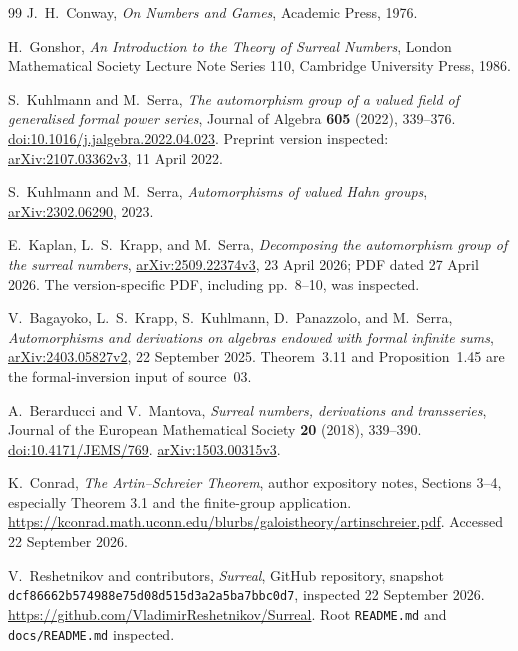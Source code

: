 \documentclass[11pt]{article}
\theoremstyle{definition}
\theoremstyle{remark}
\newcommand{\repoSHA}{\texttt{dcf86662\allowbreak b574988e\allowbreak 75d08d51\allowbreak 5d3a2a5b\allowbreak a7bbc0d7}}
\numberwithin{equation}{section}
\begin{document}
{}
\begin{thebibliography}{99}
\small\RaggedRight
{}
J.~H.~Conway,
\emph{On Numbers and Games}, Academic Press, 1976.

H.~Gonshor,
\emph{An Introduction to the Theory of Surreal Numbers},
London Mathematical Society Lecture Note Series 110,
Cambridge University Press, 1986.

S.~Kuhlmann and M.~Serra,
\emph{The automorphism group of a valued field of generalised formal power series},
Journal of Algebra \textbf{605} (2022), 339--376.
\href{https://doi.org/10.1016/j.jalgebra.2022.04.023}{doi:10.1016/j.jalgebra.2022.04.023}.
Preprint version inspected: \href{https://arxiv.org/abs/2107.03362v3}{arXiv:2107.03362v3},
11 April 2022.

S.~Kuhlmann and M.~Serra,
\emph{Automorphisms of valued Hahn groups},
\href{https://arxiv.org/abs/2302.06290}{arXiv:2302.06290}, 2023.

E.~Kaplan, L.~S.~Krapp, and M.~Serra,
\emph{Decomposing the automorphism group of the surreal numbers},
\href{https://arxiv.org/abs/2509.22374v3}{arXiv:2509.22374v3},
23 April 2026; PDF dated 27 April 2026.
The version-specific PDF, including pp.~8--10, was inspected.

V.~Bagayoko, L.~S.~Krapp, S.~Kuhlmann, D.~Panazzolo, and M.~Serra,
\emph{Automorphisms and derivations on algebras endowed with formal infinite sums},
\href{https://arxiv.org/abs/2403.05827v2}{arXiv:2403.05827v2},
22 September 2025. Theorem~3.11 and Proposition~1.45 are the formal-inversion
input of source~03.

A.~Berarducci and V.~Mantova,
\emph{Surreal numbers, derivations and transseries},
Journal of the European Mathematical Society \textbf{20} (2018), 339--390.
\href{https://doi.org/10.4171/JEMS/769}{doi:10.4171/JEMS/769}.
\href{https://arxiv.org/abs/1503.00315v3}{arXiv:1503.00315v3}.

K.~Conrad,
\emph{The Artin--Schreier Theorem}, author expository notes,
Sections 3--4, especially Theorem 3.1 and the finite-group application.
\url{https://kconrad.math.uconn.edu/blurbs/galoistheory/artinschreier.pdf}.
Accessed 22 September 2026.

V.~Reshetnikov and contributors,
\emph{Surreal}, GitHub repository, snapshot
\repoSHA, inspected 22 September 2026.
\url{https://github.com/VladimirReshetnikov/Surreal}.
Root \texttt{README.md} and \texttt{docs/README.md} inspected.


\end{thebibliography}
\end{document}
